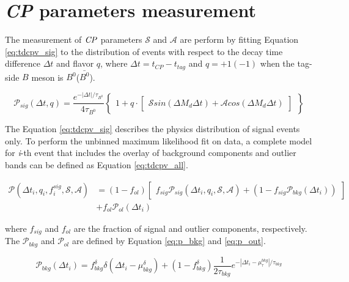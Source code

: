 \chapter{\textit{CP} parameters measurement}

The measurement of $\it{CP}$ parameters $\mathcal{S}$ and $\mathcal{A}$ are perform by fitting  Equation \ref{eq:tdcpv_sig} to the distribution of events with respect to the decay time difference $\Delta t$ and flavor $q$, where $\Delta t = t_{CP}-t_{tag}$ and $q =  +1(-1)$ when the tag-side $B$ meson is $B^0$($\bar{B^0}$). 

\begin{equation}\label{eq:tdcpv_sig}
\mathcal{P}_{sig}(\Delta t, q ) = 
\frac{e^{-|\Delta t|/\tau_{B^0}}}{4\tau_{B^0}}
\begin{Bmatrix}
1 + q \cdot 
\begin{bmatrix}
\mathcal{S}sin(\Delta M_d \Delta t) + 
\mathcal{A}cos(\Delta M_d \Delta t)
\end{bmatrix}
\end{Bmatrix}
\end{equation}

The Equation \ref{eq:tdcpv_sig} describes the physics distribution of signal events only. To perform the unbinned maximum likelihood fit on data, a complete model for \textit{i}-th event that includes the overlay of background components and outlier bands can be defined as Equation \ref{eq:tdcpv_all}.

\begin{equation}\label{eq:tdcpv_all}
\begin{split}
\mathcal{P}(\Delta t_i,q_i,f_i^{sig},\mathcal{S},\mathcal{A})
&=(1-f_{ol})\begin{bmatrix}f_{sig}\mathcal{P}_{sig}(\Delta t_i,q_i,\mathcal{S},\mathcal{A})+(1-f_{sig}\mathcal{P}_{bkg}(\Delta t_i))
\end{bmatrix}\\
&+f_{ol}\mathcal{P}_{ol}(\Delta t_i)
\end{split}
\end{equation}

where $f_{sig}$ and $f_{ol}$ are the fraction of signal and outlier components, respectively. The $\mathcal{P}_{bkg}$ and $\mathcal{P}_{ol}$ are defined by Equation \ref{eq:p_bkg} and \ref{eq:p_out}.

\begin{equation}\label{eq:p_bkg}
\mathcal{P}_{bkg} (\Delta t_i)=
f_{bkg}^{\delta}\delta(\Delta t_i-\mu_{bkg}^{\delta})+(1-f_{bkg}^{\delta})
\frac{1}{2\tau_{bkg}}e^{-|\Delta t_i-\mu_{\tau}^{bkg}|/\tau_{bkg}}
\end{equation}

